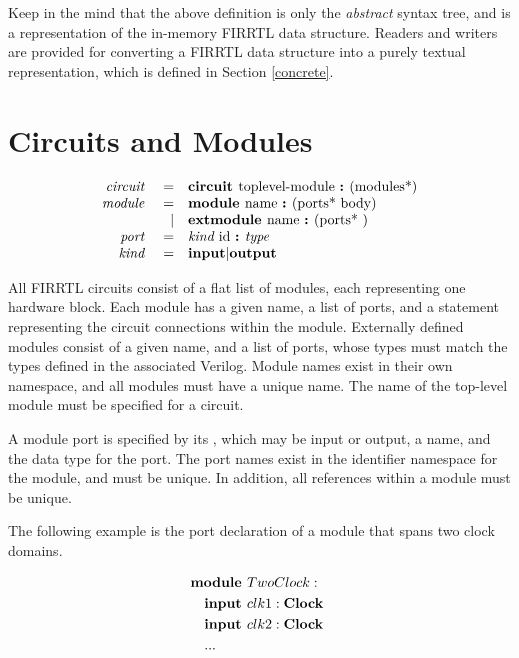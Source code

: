 \documentclass[12pt]{article}
\begin{document}
Keep in the mind that the above definition is only the {\em abstract} syntax tree, and is a representation of the in-memory FIRRTL data structure.
Readers and writers are provided for converting a FIRRTL data structure into a purely textual representation, which is defined in Section \ref{concrete}.


\section{Circuits and Modules}
\[
\begin{array}{rrl}
\text{\em circuit\ }    &=     &\text{\bf circuit\ } \text{toplevel-module } \text{\bf :\ } (\text{modules*}) \\
\text{\em module\ }     &=     &\text{\bf module\ }  \text{name } \text{\bf :\ } (\text{ports* } \text{body}) \\
                &\vert &\text{\bf extmodule\ }  \text{name } \text{\bf :\ } (\text{ports* })           \\ 
\text{\em port\ }       &=     &\text{\em kind\ } \text{id } \text{\bf :\ } \text{\em type\ }                                 \\
\text{\em kind\ }       &=     &\text{\bf input} \vert \text{\bf output}                                \\
\end{array}
\]

All FIRRTL circuits consist of a flat list of modules, each representing one hardware block.
Each module has a given name, a list of ports, and a statement representing the circuit connections within the module.
Externally defined modules consist of a given name, and a list of ports, whose types must match the types defined in the associated Verilog.
Module names exist in their own namespace, and all modules must have a unique name. The name of the top-level module must be specified for a circuit.

A module port is specified by its , which may be input or output, a name, and the data type for the port.
The port names exist in the identifier namespace for the module, and must be unique.
In addition, all references within a module must be unique.

The following example is the port declaration of a module that spans two clock domains.

\[
\begin{aligned}
&\text{\bf module\ } TwoClock : \\
&\quad \text{\bf input\ } clk1 : \text{\bf Clock\ }\\
&\quad \text{\bf input\ } clk2 : \text{\bf Clock\ }\\
&\quad ... \\
\end{aligned}
\]
\end{document}

